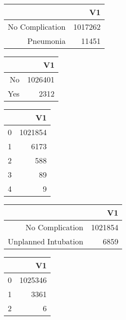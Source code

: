 \bigskip\bigskip
\centering
\begin{tabular}{rr}
  \hline
 & V1 \\ 
  \hline
No Complication & 1017262 \\ 
  Pneumonia & 11451 \\ 
   \hline
\end{tabular}

\bigskip\bigskip
\centering
\begin{tabular}{rr}
  \hline
 & V1 \\ 
  \hline
No & 1026401 \\ 
  Yes & 2312 \\ 
   \hline
\end{tabular}

\bigskip\bigskip
\centering
\begin{tabular}{rr}
  \hline
 & V1 \\ 
  \hline
0 & 1021854 \\ 
  1 & 6173 \\ 
  2 & 588 \\ 
  3 &  89 \\ 
  4 &   9 \\ 
   \hline
\end{tabular}

\bigskip\bigskip
\centering
\begin{tabular}{rr}
  \hline
 & V1 \\ 
  \hline
No Complication & 1021854 \\ 
  Unplanned Intubation & 6859 \\ 
   \hline
\end{tabular}

\bigskip\bigskip
\centering
\begin{tabular}{rr}
  \hline
 & V1 \\ 
  \hline
0 & 1025346 \\ 
  1 & 3361 \\ 
  2 &   6 \\ 
   \hline
\end{tabular}

